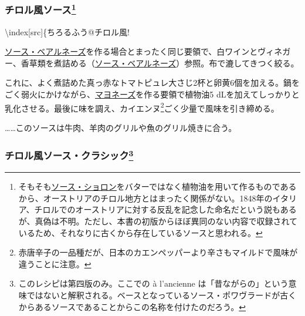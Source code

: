 \begin{recette}
\atoaki{}

\hypertarget{sauce-tyrolienne}{%
\subsubsection[チロル風ソース]{\texorpdfstring{チロル風ソース\footnote{そもそも\protect\hyperlink{sauce-choron}{ソース・ショロン}をバターではなく植物油を用いて作るものであるから、オーストリアのチロル地方とはまったく関係がない。1848年のイタリア、チロルでのオーストリアに対する反乱を記念した命名だという説もあるが、真偽は不明。ただし、本書の初版からほぼ異同のない内容で収録されているため、それなりに古くから存在しているソースと思われる。}}{チロル風ソース}}\label{sauce-tyrolienne}}


\textbackslash{}index{[}src{]}\{ちろるふう@チロル風!

\protect\hyperlink{sauce-bearnaise}{ソース・ベアルネーズ}を作る場合とまったく同じ要領で、白ワインとヴィネガー、香草類を煮詰める（\protect\hyperlink{sauce-bearnaise}{ソース・ベアルネーズ}）参照。布で漉してきつく絞る。

これに、よく煮詰めた真っ赤なトマトピュレ大さじ2杯と卵黄6個を加える。鍋をごく弱火にかけながら、\protect\hyperlink{mayonnaise}{マヨネーズ}を作る要領で植物油5
dLを加えてしっかりと乳化させる。最後に味を調え、カイエンヌ\footnote{赤唐辛子の一品種だが、日本のカエンペッパーより辛さもマイルドで風味が違うことに注意。}ごく少量で風味を引き締める。

\ldots{}\ldots{}このソースは牛肉、羊肉のグリルや魚のグリル焼きに合う。

\atoaki{}

\hypertarget{sauce-tyrolienne-a-l-ancienne}{%
\subsubsection[チロル風ソース・クラシック]{\texorpdfstring{チロル風ソース・クラシック\footnote{このレシピは第四版のみ。ここでの
  à l'ancienne
  は「昔ながらの」という意味ではないと解釈される。ベースとなっているソース・ポワヴラードが古くからあるソースであることからこの名称を付けたのだろう。}}{チロル風ソース・クラシック}}\label{sauce-tyrolienne-a-l-ancienne}}



\end{recette}
